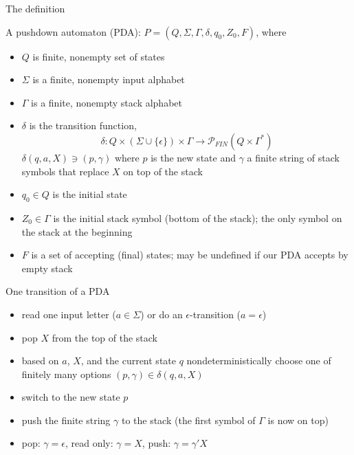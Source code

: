 \documentclass[handout]{beamer}
\begin{document}
\begin{frame}{The definition}

    \alert{A pushdown automaton} (\alert{PDA}): $P=(Q,\Sigma,\Gamma,\delta,q_0,Z_0,F)$, where
        
    \begin{itemize}
        \item $Q$ is finite, nonempty set of states
        \item $\Sigma$ is a finite, nonempty \alert{input alphabet}
        \item $\Gamma$ is a finite, nonempty \alert{stack alphabet}
        \item $\delta$ is the \alert{transition function}, 
        $$
        \delta\colon Q\times (\Sigma\cup \{\epsilon\})\times \Gamma \to \mathcal P_{FIN}(Q \times \Gamma^*)
        $$ 
        $\delta(q,a,X)\ni(p,\gamma)$ where $p$ is the new state and $\gamma$ a finite string of stack symbols that \alert{replace} $X$ on top of the stack
        \item $q_0\in Q$ is the \alert{initial state}
        \item $Z_0\in\Gamma$ is the \alert{initial stack symbol} (\alert{bottom of the stack}); the only symbol on the stack at the beginning
        \item $F$ is a set of \alert{accepting} (\alert{final}) states; may be undefined if our PDA \alert{accepts by empty stack}
    \end{itemize}

\end{frame}


\begin{frame}{One transition of a PDA}   

    \begin{itemize}
        \item read one input letter ($a\in\Sigma$) or do an $\epsilon$-transition ($a=\epsilon$)
        \item pop $X$ from the top of the stack
        \item based on $a$, $X$, and the current state $q$ nondeterministically choose one of finitely many options $(p,\gamma)\in\delta(q,a,X)$
        \item switch to the new state $p$
        \item push the finite string $\gamma$ to the stack (the first symbol of $\Gamma$ is now on top)
        \item \alert{pop}: $\gamma=\epsilon$, \alert{read} only: $\gamma=X$, \alert{push}: $\gamma=\gamma'X$
\end{itemize}

\end{frame}
\end{document}

